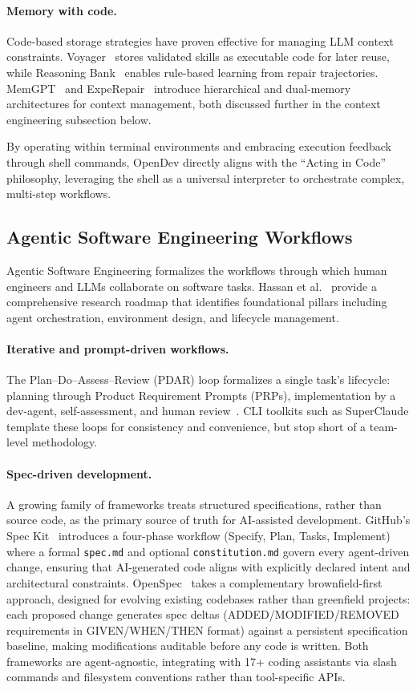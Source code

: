 \paragraph{Memory with code.} Code-based storage strategies have proven effective for managing LLM context constraints. Voyager~\cite{voyager} stores validated skills as executable code for later reuse, while Reasoning Bank~\cite{reasoning_bank} enables rule-based learning from repair trajectories. MemGPT~\cite{packer2023memgpt} and ExpeRepair~\cite{experepair} introduce hierarchical and dual-memory architectures for context management, both discussed further in the context engineering subsection below.

By operating within terminal environments and embracing execution feedback through shell commands, OpenDev directly aligns with the ``Acting in Code'' philosophy, leveraging the shell as a universal interpreter to orchestrate complex, multi-step workflows.

\subsection{Agentic Software Engineering Workflows}
Agentic Software Engineering formalizes the workflows through which human engineers and LLMs collaborate on software tasks. Hassan et al.~\cite{sase_survey} provide a comprehensive research roadmap that identifies foundational pillars including agent orchestration, environment design, and lifecycle management.

\paragraph{Iterative and prompt-driven workflows.} The Plan--Do--Assess--Review (PDAR) loop formalizes a single task's lifecycle: planning through Product Requirement Prompts (PRPs), implementation by a dev-agent, self-assessment, and human review~\cite{sase_survey}. CLI toolkits such as SuperClaude template these loops for consistency and convenience, but stop short of a team-level methodology.

\paragraph{Spec-driven development.} A growing family of frameworks treats structured specifications, rather than source code, as the primary source of truth for AI-assisted development. GitHub's Spec Kit~\cite{github2025speckit} introduces a four-phase workflow (Specify, Plan, Tasks, Implement) where a formal \texttt{spec.md} and optional \texttt{constitution.md} govern every agent-driven change, ensuring that AI-generated code aligns with explicitly declared intent and architectural constraints. OpenSpec~\cite{fission2025openspec} takes a complementary brownfield-first approach, designed for evolving existing codebases rather than greenfield projects: each proposed change generates spec deltas (ADDED/MODIFIED/REMOVED requirements in GIVEN/WHEN/THEN format) against a persistent specification baseline, making modifications auditable before any code is written. Both frameworks are agent-agnostic, integrating with 17+ coding assistants via slash commands and filesystem conventions rather than tool-specific APIs.

